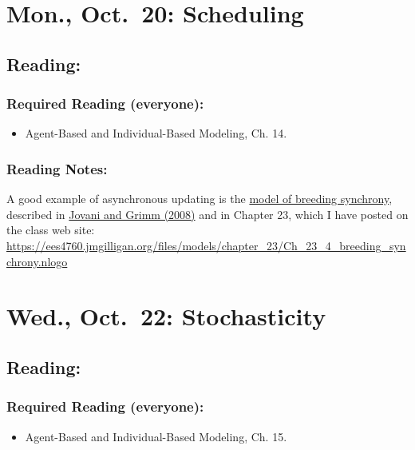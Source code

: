 \documentclass[
]{article}
\providecommand{\tightlist}{%
  \setlength{\itemsep}{0pt}\setlength{\parskip}{0pt}}
\begin{document}
\section{Mon., Oct.~20: Scheduling}\label{mon.-oct.-20-scheduling}

\subsection{Reading:}\label{reading-16}

\subsubsection{Required Reading
(everyone):}\label{required-reading-everyone-13}

\begin{itemize}
\tightlist
\item
  Agent-Based and Individual-Based Modeling, Ch. 14.
\end{itemize}

\subsubsection{Reading Notes:}\label{reading-notes-13}

A good example of asynchronous updating is the
\href{/files/models/chapter_23/Ch_23_4_breeding_synchrony.nlogo}{model
of breeding synchrony}, described in
\href{/files/models/chapter_05/Jovani_Grimm_2008_Breeding.pdf}{Jovani
and Grimm (2008)} and in Chapter 23, which I have posted on the class
web site:
\url{https://ees4760.jmgilligan.org/files/models/chapter_23/Ch_23_4_breeding_synchrony.nlogo}

\section{Wed., Oct.~22: Stochasticity}\label{wed.-oct.-22-stochasticity}

\subsection{Reading:}\label{reading-17}

\subsubsection{Required Reading
(everyone):}\label{required-reading-everyone-14}

\begin{itemize}
\tightlist
\item
  Agent-Based and Individual-Based Modeling, Ch. 15.
\end{itemize}
\end{document}
